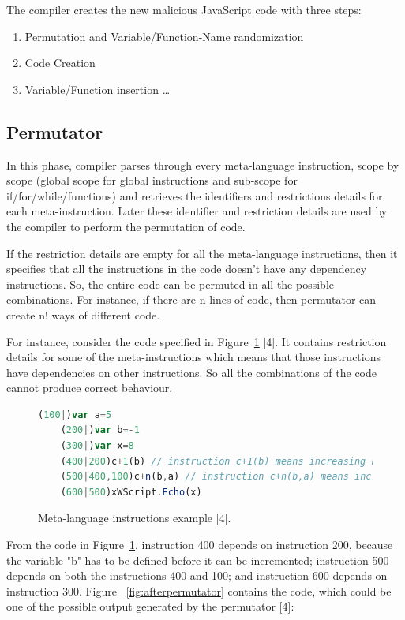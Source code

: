 The compiler creates the new malicious JavaScript code with three steps:

\begin{enumerate}
  \item Permutation and Variable/Function-Name randomization
  \item Code Creation
  \item Variable/Function insertion \ldots
\end{enumerate}

\subsection{Permutator}

In this phase, compiler parses through every meta-language instruction, scope by scope (global scope for global instructions and sub-scope for if/for/while/functions) and retrieves the identifiers and restrictions details for each meta-instruction. Later these identifier and restriction details are used by the compiler to perform the permutation of code.

If the restriction details are empty for all the meta-language instructions, then it specifies that all the instructions in the code doesn't have any dependency instructions. So, the entire code can be permuted in all the possible combinations. For instance, if there are n lines of code, then permutator can create n! ways of different code. 

For instance, consider the code specified in Figure~\ref{fig:permutator} [4]. It contains restriction details for some of the meta-instructions which means that those instructions have dependencies on other instructions. So all the combinations of the code cannot produce correct behaviour. 


\begin{figure}
  \centering
  \begin{lstlisting}[language=JavaScript]
	(100|)var a=5
	(200|)var b=-1
	(300|)var x=8
	(400|200)c+1(b)	// instruction c+1(b) means increasing b by 1: i.e. b++
	(500|400,100)c+n(b,a) // instruction c+n(b,a) means increasing b by a: i.e. b+=a
	(600|500)xWScript.Echo(x)
\end{lstlisting}


    \caption[Meta-language instructions example]{Meta-language instructions example [4].}
    \label{fig:permutator}
\end{figure}


From the code in Figure~\ref{fig:permutator}, instruction 400 depends on instruction 200, because the variable "b" has to be defined before it can be incremented; instruction 500 depends on both the instructions 400 and 100; and instruction 600 depends on instruction 300. Figure ~\ref{fig:afterpermutator} contains the code, which could be one of the possible output generated by the permutator [4]:

